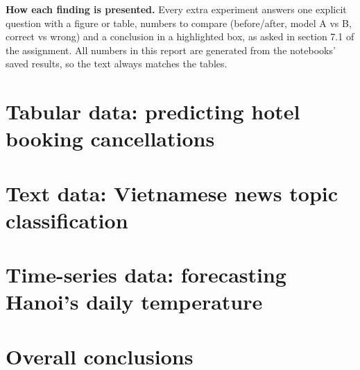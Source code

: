 \documentclass[11pt,a4paper,openany]{report}
\begin{document}
\textbf{How each finding is presented.} Every extra experiment answers one explicit question with a figure or table, numbers
to compare (before/after, model A vs B, correct vs wrong) and a conclusion in a highlighted box, as asked in section 7.1 of the
assignment. All numbers in this report are generated from the notebooks' saved results, so the text always matches the tables.

\sectionsonnewpage   %
\chapter{Tabular data: predicting hotel booking cancellations}\label{ch:tabular}


\chapter{Text data: Vietnamese news topic classification}\label{ch:text}


\chapter{Time-series data: forecasting Hanoi's daily temperature}\label{ch:timeseries}


\sectionsflow
\chapter{Overall conclusions}\label{ch:conclusions}
\end{document}
